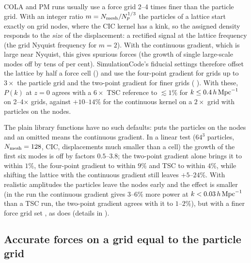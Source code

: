 COLA and PM runs usually use a force grid 2--4 times finer than the particle grid. With an integer ratio
$m=N_{\rm mesh}/N_p^{1/3}$ the particles of a lattice start exactly on grid nodes, where the CIC kernel has a kink, so
the assigned density responds to the \emph{size} of the displacement: a rectified signal at the lattice frequency
(the grid Nyquist frequency for $m=2$). With the continuous gradient, which is large near Nyquist, this gives spurious
forces (the growth of single large-scale modes off by tens of per cent). SimulationCode's fiducial settings therefore
offset the lattice by half a force cell () and use the four-point gradient for grids up to
$3\times$ the particle grid and the two-point gradient for finer grids (
). With these, $P(k)$ at $z=0$ agrees with a $6\times$ TSC reference to $\lesssim1\%$ for $k\le0.4\,h\,\mathrm{Mpc}^{-1}$
on 2--4$\times$ grids, against $+10$--$14\%$ for the continuous kernel on a $2\times$ grid with particles on the nodes.

The plain library functions have no such defaults:  puts the particles on the nodes and
an omitted  means the continuous gradient. In a linear test ($64^3$ particles, $N_{\rm mesh}=128$,
CIC, displacements much smaller than a cell) the growth of the first six modes is off by factors $0.5$--$3.8$; the
two-point gradient alone brings it to within $1\%$, the four-point gradient to within $9\%$ and TSC to within $4\%$,
while shifting the lattice with the continuous gradient still leaves $+5$--$24\%$. With realistic amplitudes the
particles leave the nodes early and the effect is smaller (in the  run the continuous gradient
gives $3$--$6\%$ more power at $k<0.03\,h\,\mathrm{Mpc}^{-1}$ than a TSC run, the two-point gradient agrees with it to $1$--$2\%$),
but with a finer force grid set
, as  does
(details in ).

\subsection{Accurate forces on a grid equal to the particle grid}

